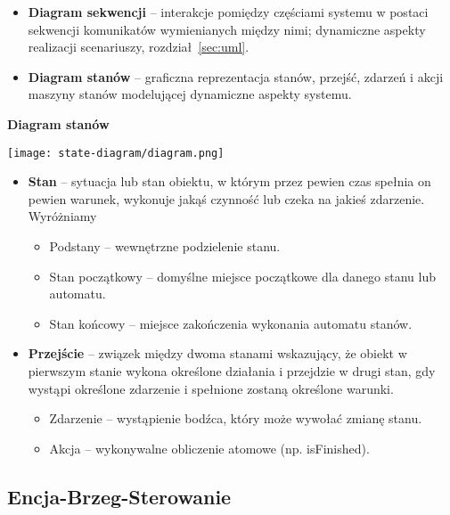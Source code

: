 \documentclass[main.tex]{subfiles}
\begin{document}
    \begin{itemize}
        \item \textbf{Diagram sekwencji} -- interakcje pomiędzy częściami systemu w postaci sekwencji
        komunikatów wymienianych między nimi; dynamiczne aspekty realizacji scenariuszy, rozdział~\ref{sec:uml}.
        \item \textbf{Diagram stanów} -- graficzna reprezentacja stanów, przejść, zdarzeń i akcji maszyny stanów
        modelującej dynamiczne aspekty systemu.
    \end{itemize}

    \textbf{Diagram stanów}

    \begin{center}
        \texttt{[image: state-diagram/diagram.png]}
    \end{center}


    \begin{itemize}
        \item \textbf{Stan} -- sytuacja lub stan obiektu, w którym przez pewien czas spełnia on pewien warunek,
        wykonuje jakąś czynność lub czeka na jakieś zdarzenie. Wyróżniamy

        \begin{itemize}[noitemsep]
            \item Podstany -- wewnętrzne podzielenie stanu.
            \item Stan początkowy -- domyślne miejsce początkowe dla danego stanu lub automatu.
            \item Stan końcowy -- miejsce zakończenia wykonania automatu stanów.
        \end{itemize}

        \item \textbf{Przejście} -- związek między dwoma stanami wskazujący, że obiekt w pierwszym stanie wykona
        określone działania i przejdzie w drugi stan, gdy wystąpi określone zdarzenie i spełnione zostaną
        określone warunki.

        \begin{itemize}[noitemsep]
            \item Zdarzenie -- wystąpienie bodźca, który może wywołać zmianę stanu.
            \item Akcja -- wykonywalne obliczenie atomowe (np. isFinished).
        \end{itemize}
    \end{itemize}


    \subsection{Encja-Brzeg-Sterowanie}
\end{document}
